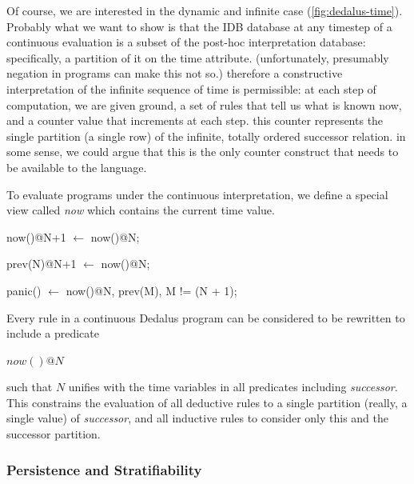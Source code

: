 Of course, we are interested in the dynamic and infinite case (\ref{fig:dedalus-time}).
Probably what we want to show is that the IDB database at any timestep of a continuous evaluation is a subset
of the post-hoc interpretation database: specifically, a partition of it on the time attribute.  (unfortunately, presumably
negation in programs can make this not so.)  therefore a constructive interpretation of the infinite sequence of time is permissible:
at each step of computation, we are given ground, a set of rules that tell us what is known now, and a counter value that increments
at each step.  this counter represents the single partition (a single row) of the infinite, totally ordered successor relation.
in some sense, we could argue that this is the only counter construct that needs to be available to the language.


To evaluate programs under the continuous interpretation, we define a special view called \emph{now} which contains the current 
time value.

\begin{Dedalus}
now()@N+1  \(\leftarrow\)
    now()@N;

prev(N)@N+1  \(\leftarrow\)
    now()@N;

panic()  \(\leftarrow\)
    now()@N,
    prev(M),
    M != (N + 1);
\end{Dedalus}

Every rule in a continuous Dedalus program can be considered to be rewritten to include a predicate

$now()@N$

such that $N$ unifies with the time variables in all predicates including \emph{successor}.  This constrains the evaluation of all deductive 
rules to a single partition (really, a single value) of \emph{successor}, and all inductive rules to consider only this and the successor partition.

\subsubsection{Persistence and Stratifiability}


